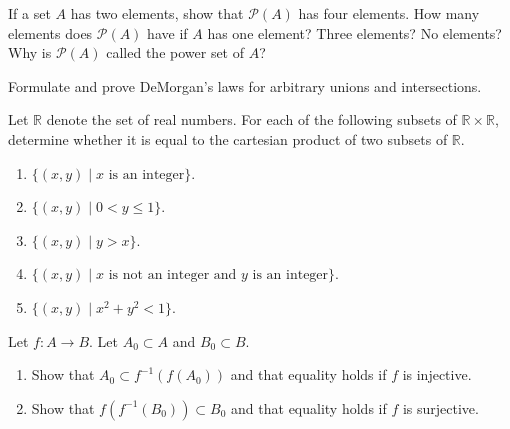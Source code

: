   \begin{exercise}[Munkres 1.8]
    If a set $A$ has two elements, show that $\mathcal{P}(A)$ has four elements. How many elements does $\mathcal{P}(A)$ have if $A$ has one element? Three elements? No elements? Why is $\mathcal{P}(A)$ called the power set of $A$?
  \end{exercise}
  \begin{solution}
    
  \end{solution}

  \begin{exercise}[Munkres 1.9]
    Formulate and prove DeMorgan's laws for arbitrary unions and intersections.
  \end{exercise}
  \begin{solution}
    
  \end{solution}

  \begin{exercise}[Munkres 1.10]
    Let $\mathbb{R}$ denote the set of real numbers. For each of the following subsets of $\mathbb{R} \times \mathbb{R}$, determine whether it is equal to the cartesian product of two subsets of $\mathbb{R}$.
    \begin{enumerate}
      \item $\{(x, y) \mid x \text{ is an integer}\}$.
      \item $\{(x, y) \mid 0 < y \leq 1\}$.
      \item $\{(x, y) \mid y > x\}$.
      \item $\{(x, y) \mid x \text{ is not an integer and } y \text{ is an integer}\}$.
      \item $\{(x, y) \mid x^2 + y^2 < 1\}$.
    \end{enumerate}
  \end{exercise}
  \begin{solution}
    
  \end{solution}

  \begin{exercise}[Munkres 2.1]
    Let $f: A \to B$. Let $A_0 \subset A$ and $B_0 \subset B$.
    \begin{enumerate}
      \item Show that $A_0 \subset f^{-1}(f(A_0))$ and that equality holds if $f$ is injective.
      \item Show that $f(f^{-1}(B_0)) \subset B_0$ and that equality holds if $f$ is surjective.
    \end{enumerate}
  \end{exercise}
  \begin{solution}
    
  \end{solution}

